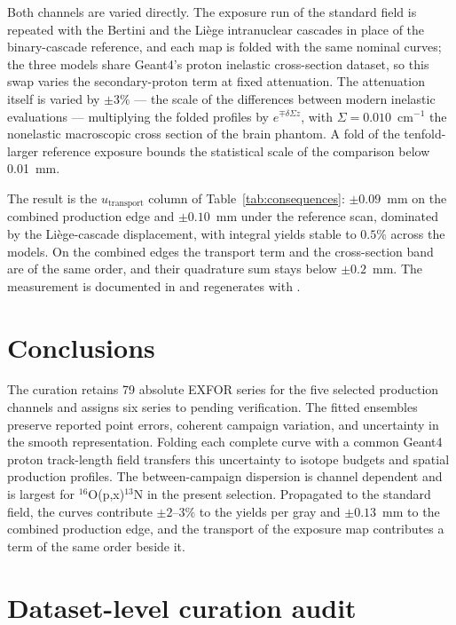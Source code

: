 \documentclass[11pt]{article}
\begin{document}
Both channels are varied directly.  The exposure run of the standard field
is repeated with the Bertini and the Li\`ege intranuclear cascades in
place of the binary-cascade reference, and each map is folded with the
same nominal curves; the three models share Geant4's proton inelastic
cross-section dataset, so this swap varies the secondary-proton term at
fixed attenuation.  The attenuation itself is varied by $\pm3\%$ --- the
scale of the differences between modern inelastic evaluations ---
multiplying the folded profiles by $e^{\mp\delta\Sigma z}$, with
$\Sigma = 0.010$~cm$^{-1}$ the nonelastic macroscopic cross section of the
brain phantom.  A fold of the tenfold-larger reference exposure bounds the
statistical scale of the comparison below \SI{0.01}{mm}.

The result is the $u_{\mathrm{transport}}$ column of
Table~\ref{tab:consequences}: $\pm0.09$~mm on the combined production edge
and $\pm0.10$~mm under the reference scan, dominated by the Li\`ege-cascade
displacement, with integral yields stable to $0.5\%$ across the models.
On the combined edges the transport term and the cross-section band are of
the same order, and their quadrature sum stays below $\pm0.2$~mm.  The
measurement is documented in  and
regenerates with .

\section{Conclusions}

The curation retains 79 absolute EXFOR series for the five selected production
channels and assigns six series to pending verification.  The fitted ensembles
preserve reported point errors, coherent campaign variation, and uncertainty
in the smooth representation.  Folding each complete curve with a common
Geant4 proton track-length field transfers this uncertainty to isotope
budgets and spatial production profiles.  The between-campaign dispersion is
channel dependent and is largest for $^{16}$O(p,x)$^{13}$N in the present
selection.  Propagated to the standard field, the curves contribute
$\pm2$--$3\%$ to the yields per gray and $\pm0.13$~mm to the combined
production edge, and the transport of the exposure map contributes a term
of the same order beside it.

\appendix

\section{Dataset-level curation audit}
\end{document}
